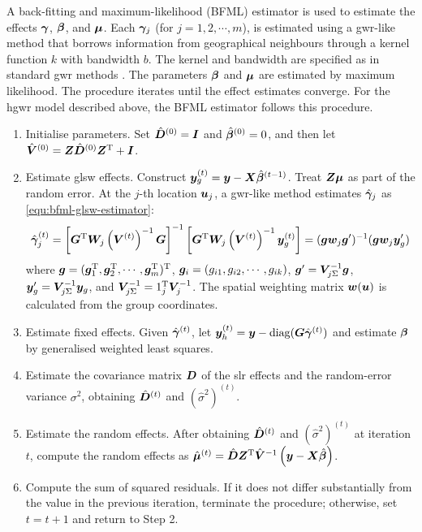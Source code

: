 \documentclass[times]{interact}
\theoremstyle{plain}%
\theoremstyle{definition}
\theoremstyle{remark}
\begin{document}
A back-fitting and maximum-likelihood (BFML) estimator is used to estimate the effects $\bm{\gamma}$, $\bm{\beta}$, and $\bm{\mu}$.
Each $\bm{\gamma}_{j}$ (for $j=1,2,\cdots,m$), is estimated using a \gls{gwr}-like method that borrows information from geographical neighbours through a kernel function $k$ with bandwidth $b$.
The kernel and bandwidth are specified as in standard \gls{gwr} methods \citep{ComberBrunsdon-2022}.
The parameters $\bm{\beta}$ and $\bm{\mu}$ are estimated by maximum likelihood.
The procedure iterates until the effect estimates converge.
For the \gls{hgwr} model described above, the BFML estimator follows this procedure.

\begin{enumerate}[label=\textbf{Step \arabic*.}, left=0.5em, itemindent=2em]
\item Initialise parameters. Set $\hat{\bm{D}}^{(0)} = \bm{I}$ and $\hat{\bm{\beta}}^{(0)} = 0$, and then let $\hat{\bm{V}}^{(0)}=\bm{Z}\hat{\bm{D}}^{(0)}\bm{Z}^\mathrm{T}+\bm{I}$.

\item Estimate \gls{glsw} effects.
Construct $\bm{y}_g^{(t)}=\bm{y}-\bm{X}\hat{\bm{\beta}}^{(t-1)}$.
Treat $\bm{Z}\bm{\mu}$ as part of the random error.
At the $j$-th location $\bm{u}_j$, a \gls{gwr}-like method estimates $\hat{\bm{\gamma}}_j$ as \autoref{equ:bfml-glsw-estimator}:
\begin{equation}\label{equ:bfml-glsw-estimator}
  \hat{\bm{\gamma}}_j^{(t)}
  = \left[\bm{G}^\mathrm{T}\bm{W}_j\left(\bm{V}^{(t)}\right)^{-1}\bm{G}\right]^{-1} \left[\bm{G}^\mathrm{T}\bm{W}_j\left(\bm{V}^{(t)}\right)^{-1}\bm{y}_g^{(t)}\right] 
  = (\bm{g}\bm{w}_j\bm{g}')^{-1}(\bm{g}\bm{w}_j\bm{y}'_{g})
\end{equation}
where $\bm{g}=(\bm{g}_1^\mathrm{T} , \bm{g}_2^\mathrm{T}, \cdots, \bm{g}_m^\mathrm{T})^\mathrm{T}$,
$\bm{g}_i=(g_{i1},g_{i2},\cdots,g_{ik})$,
$\bm{g}'=\bm{V}_{j\Sigma}^{-1}\bm{g} $,
$\bm{y}'_{g}=\bm{V}_{j\Sigma}^{-1}\bm{y}_g$,
and $\bm{V}_{j\Sigma}^{-1}=1_{j}^\mathrm{T}\bm{V}_{j}^{-1}$.
The spatial weighting matrix $\bm{w}(\bm{u})$ is calculated from the group coordinates.

\item Estimate fixed effects.
Given $\hat{\bm{\gamma}}^{(t)}$, let $\bm{y}_h^{(t)}=\bm{y} - \operatorname{diag}(\bm{G}\hat{\bm{\gamma}}^{(t)})$ and estimate $\bm{\beta}$ by generalised weighted least squares.

\item Estimate the covariance matrix $\bm{D}$ of the \gls{slr} effects and the random-error variance $\sigma^2$, obtaining $\hat{\bm{D}}^{(t)}$ and $(\hat{\sigma}^2)^{(t)}$.

\item Estimate the random effects.
After obtaining $\hat{\bm{D}}^{(t)}$ and $(\hat{\sigma}^2)^{(t)}$ at iteration $t$, compute the random effects as $\hat{\bm{\mu}}^{(t)} = \hat{\bm{D}} \bm{Z}^\mathrm{T}\hat{\bm{V}}^{-1}\left(\bm{y}-\bm{X}\hat{\bm{\beta}}\right)$.

\item Compute the sum of squared residuals.
If it does not differ substantially from the value in the previous iteration, terminate the procedure; otherwise, set $t=t+1$ and return to Step 2.
\end{enumerate}
\end{document}
